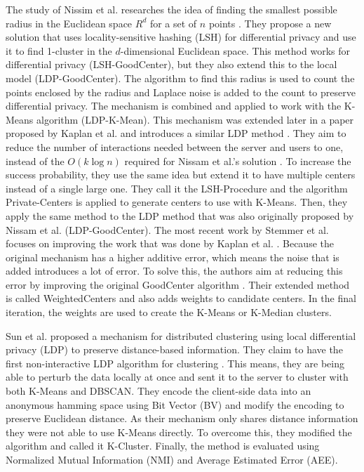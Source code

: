 The study of Nissim et al. researches the idea of finding the smallest possible radius in the Euclidean space  $R^d$ for a set of $n$ points \citep{nissim_clustering_2018}.
They propose a new solution that uses locality-sensitive hashing (LSH) for differential privacy and use it to find 1-cluster in the $d$-dimensional Euclidean space.
This method works for differential privacy (LSH-GoodCenter), but they also extend this to the local model (LDP-GoodCenter).
The algorithm to find this radius is used to count the points enclosed by the radius and Laplace noise is added to the count to preserve differential privacy.
The mechanism is combined and applied to work with the K-Means algorithm (LDP-K-Mean).
This mechanism was extended later in a paper proposed by Kaplan et al. and introduces a similar LDP method \citep{kaplan_differentially_2018}.
They aim to reduce the number of interactions needed between the server and users to one, instead of the $O(k\log n)$ required for Nissam et al.’s solution \citep{nissim_clustering_2018}.
To increase the success probability, they use the same idea but extend it to have multiple centers instead of a single large one.
They call it the LSH-Procedure and the algorithm Private-Centers is applied to generate centers to use with K-Means.
Then, they apply the same method to the LDP method that was also originally proposed by Nissam et al. (LDP-GoodCenter).
The most recent work by Stemmer et al. focuses on improving the work that was done by Kaplan et al. \citep{kaplan_differentially_2018,stemmer_locally_2021}.
Because the original mechanism has a higher additive error, which means the noise that is added introduces a lot of error.
To solve this, the authors aim at reducing this error by improving the original GoodCenter algorithm \citep{nissim_clustering_2018}.
Their extended method is called WeightedCenters and also adds weights to candidate centers.
In the final iteration, the weights are used to create the K-Means or K-Median clusters.

Sun et al. proposed a mechanism for distributed clustering using local differential privacy (LDP) to preserve distance-based information.
They claim to have the first non-interactive LDP algorithm for clustering \citep{sun_differentially_2019}.
This means, they are being able to perturb the data locally at once and sent it to the server to cluster with both K-Means and DBSCAN.
They encode the client-side data into an anonymous hamming space using Bit Vector (BV) and modify the encoding to preserve Euclidean distance.
As their mechanism only shares distance information they were not able to use K-Means directly.
To overcome this, they modified the algorithm and called it K-Cluster.
Finally, the method is evaluated using Normalized Mutual Information (NMI) and Average Estimated Error (AEE).

